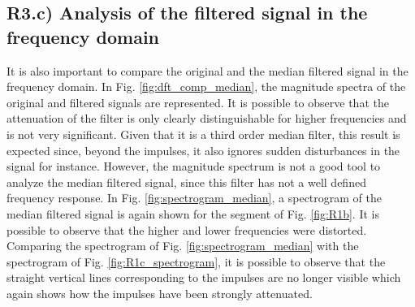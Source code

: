 \documentclass[a4paper, oneside, 11pt]{article}
\begin{document}
\subsection{R3.c) Analysis of the filtered signal in the frequency domain}

It is also important to compare the original and the median filtered signal in the frequency domain. In Fig. \ref{fig:dft_comp_median}, the magnitude spectra of the original and filtered signals are represented. It is possible to observe that the attenuation of the filter is only clearly distinguishable for higher frequencies and is not very significant. Given that it is a third order median filter, this result is expected since, beyond the impulses, it also ignores sudden disturbances in the signal for instance. However, the magnitude spectrum is not a good tool to analyze the median filtered signal, since this filter has not a well defined frequency response. In Fig. \ref{fig:spectrogram_median}, a spectrogram of the median filtered signal is again shown for the segment of Fig. \ref{fig:R1b}. It is possible to observe that the higher and lower frequencies were distorted. Comparing the spectrogram of Fig. \ref{fig:spectrogram_median} with the spectrogram of Fig. \ref{fig:R1c_spectrogram}, it is possible to observe that the straight vertical lines corresponding to the impulses are no longer visible which again shows how the impulses have been strongly attenuated.
\end{document}
